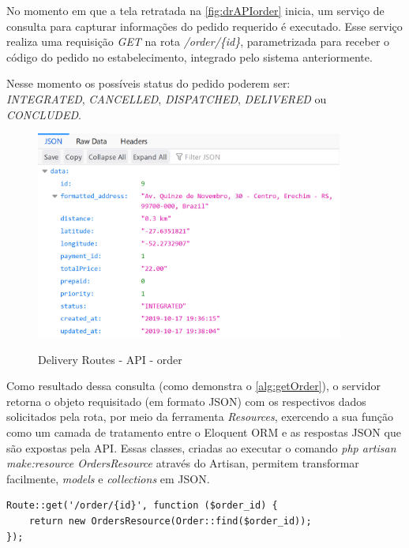 No momento em que a tela retratada na \autoref{fig:drAPIorder} inicia, um serviço de consulta para capturar informações do pedido requerido é executado. Esse serviço realiza uma requisição \textit{GET} na rota \textit{/order/\{id\}}, parametrizada para receber o código do pedido no estabelecimento, integrado pelo sistema anteriormente.

Nesse momento os possíveis status do pedido poderem ser: 
\\ \textit{INTEGRATED}, \textit{CANCELLED}, \textit{DISPATCHED}, \textit{DELIVERED} ou \textit{CONCLUDED}.

\begin{figure}[H]
    \centering
    \caption{Delivery Routes - API - order}
    \includegraphics[width=0.9\textwidth]{./dados/figuras/fig22}
    \label{fig:drAPIorder}
\end{figure}

Como resultado dessa consulta (como demonstra o \autoref{alg:getOrder}), o servidor retorna o objeto requisitado (em formato JSON) com os respectivos dados solicitados pela rota, por meio da ferramenta  \textit{Resources}, exercendo a sua função como um camada de tratamento entre o Eloquent ORM e as respostas JSON que são expostas pela API. Essas classes, criadas ao executar o comando \textit{php artisan make:resource OrdersResource} através do Artisan, permitem transformar facilmente, \textit{models} e \textit{collections} em JSON.

\begin{lstlisting}[caption={Delivery Routes - Route order}, style=htmlcssjs, label=alg:getOrder]
Route::get('/order/{id}', function ($order_id) {
    return new OrdersResource(Order::find($order_id));
});
\end{lstlisting}